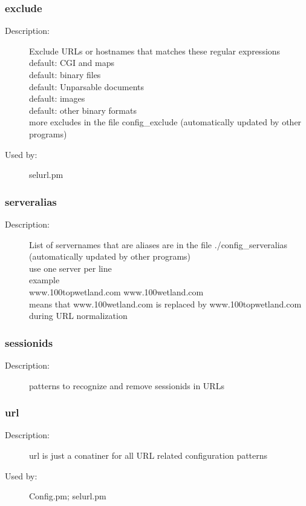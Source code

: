 \subsubsection{exclude}
\label{exclude}
\begin{description}
\item[Description:] Exclude URLs or hostnames that matches these regular expressions \\  default: CGI and maps \\  default: binary files \\  default: Unparsable documents \\  default: images \\  default: other binary formats \\ more excludes in the file config\_exclude (automatically updated by other programs)
\item[Used by:] selurl.pm
\end{description}
\subsubsection{serveralias}
\label{serveralias}
\begin{description}
\item[Description:] List of servernames that are aliases are in the file ./config\_serveralias \\     (automatically updated by other programs) \\ use one server per line \\ example \\ www.100topwetland.com  www.100wetland.com \\   means that www.100wetland.com is replaced by www.100topwetland.com during URL normalization
\end{description}
\subsubsection{sessionids}
\label{sessionids}
\begin{description}
\item[Description:] patterns to recognize and remove sessionids in URLs
\end{description}
\subsubsection{url}
\label{url}
\begin{description}
\item[Description:] url is just a conatiner for all URL related configuration patterns
\item[Used by:] Config.pm; selurl.pm
\end{description}
